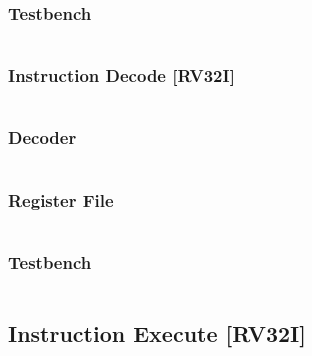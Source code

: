 \subsubsection{Testbench}
\begin{code}
\label{code:IF_TB}
\inputminted[fontsize=\footnotesize]{vhdl}{\simfolder IF_testbench.vhd}
\end{code}
\newpage

\subsubsection{Instruction Decode [RV32I]}
\begin{code}
\label{code:ID_code}  
\inputminted[fontsize=\footnotesize]{vhdl}{\srcfolder instr_decode.vhd}
\end{code}

\subsubsection{Decoder}
\begin{code}
\label{code:ID_decoder}  
\inputminted[fontsize=\footnotesize]{vhdl}{\srcfolder decoder.vhd}
\end{code}

\subsubsection{Register File}
\begin{code}
\label{code:reg_file}  
\inputminted[fontsize=\footnotesize]{vhdl}{\srcfolder register_file.vhd}
\end{code}

\subsubsection{Testbench}
\begin{code}
\label{code:ID_TB}  
\inputminted[fontsize=\footnotesize]{vhdl}{\simfolder ID_testbench.vhd}
\end{code}
\newpage


\subsection{Instruction Execute [RV32I]}
